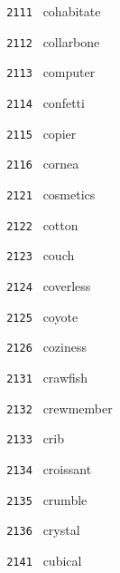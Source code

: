 \documentclass[11pt]{article}
\begin{document}
\begin{multicols}{6}
\small
\noindent \texttt{ 2111 } \hspace{1mm} cohabitate  \par
\noindent \texttt{ 2112 } \hspace{1mm} collarbone  \par
\noindent \texttt{ 2113 } \hspace{1mm} computer  \par
\noindent \texttt{ 2114 } \hspace{1mm} confetti  \par
\noindent \texttt{ 2115 } \hspace{1mm} copier  \par
\noindent \texttt{ 2116 } \hspace{1mm} cornea  \par
\noindent \texttt{ 2121 } \hspace{1mm} cosmetics  \par
\noindent \texttt{ 2122 } \hspace{1mm} cotton  \par
\noindent \texttt{ 2123 } \hspace{1mm} couch  \par
\noindent \texttt{ 2124 } \hspace{1mm} coverless  \par
\noindent \texttt{ 2125 } \hspace{1mm} coyote  \par
\noindent \texttt{ 2126 } \hspace{1mm} coziness  \par
\noindent \texttt{ 2131 } \hspace{1mm} crawfish  \par
\noindent \texttt{ 2132 } \hspace{1mm} crewmember  \par
\noindent \texttt{ 2133 } \hspace{1mm} crib  \par
\noindent \texttt{ 2134 } \hspace{1mm} croissant  \par
\noindent \texttt{ 2135 } \hspace{1mm} crumble  \par
\noindent \texttt{ 2136 } \hspace{1mm} crystal  \par
\noindent \texttt{ 2141 } \hspace{1mm} cubical  \par

\end{multicols}
\end{document}
